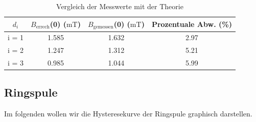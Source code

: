   \begin{table}
    \centering
    \caption{Vergleich der Messwerte mit der Theorie}
    \begin{tabular}{c c c c }
      \toprule
      $d_{i}$ & $B_{\text{errech}}$(0) ($\unit{\milli\tesla}$) &  $B_{\text{gemessen}}$(0) ($\unit{\milli\tesla}$) & Prozentuale Abw. (\%)\\
      \midrule
      i = 1  & 1.585 &         1.632  &     2.97 \\ 
      i = 2  & 1.247 &         1.312  &     5.21 \\ 
      i = 3  & 0.985 &         1.044  &     5.99 \\ 
      \bottomrule
    \end{tabular}
  \end{table}

\subsection{Ringspule}

Im folgenden wollen wir die Hysteresekurve der Ringspule graphisch darstellen.

